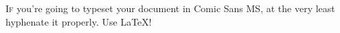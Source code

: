 \documentclass[paper=a6,pagesize=pdftex]{scrbook}
\begin{document}
\pagestyle{empty}

\parbox{3.6cm}{
\lettrine[lraise=-0.05,loversize=0.1]{I}{f} you're going to typeset your document in Comic Sans MS,
at the very least hyphenate it properly. Use \LaTeX!
}
\end{document}
